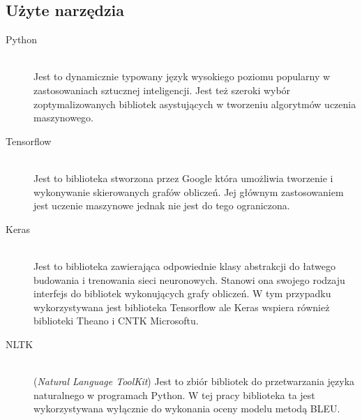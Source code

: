 \subsection{Użyte narzędzia}
\begin{description}
	\item[Python]     \hfill \\ Jest to dynamicznie typowany język wysokiego poziomu popularny w zastosowaniach sztucznej inteligencji. Jest też szeroki wybór zoptymalizowanych bibliotek asystujących w tworzeniu algorytmów uczenia maszynowego.
	\item[Tensorflow] \hfill \\ Jest to biblioteka stworzona przez Google która umożliwia tworzenie i wykonywanie skierowanych grafów obliczeń\cite{Tensorflow}. Jej głównym zastosowaniem jest uczenie maszynowe jednak nie jest do tego ograniczona.
	\item[Keras]      \hfill \\ Jest to biblioteka zawierająca odpowiednie klasy abstrakcji do łatwego budowania i trenowania sieci neuronowych.\cite{Keras} Stanowi ona swojego rodzaju interfejs do bibliotek wykonujących grafy obliczeń. W tym przypadku wykorzystywana jest biblioteka Tensorflow ale Keras wspiera również biblioteki Theano i CNTK Microsoftu.
	\item[NLTK]       \hfill \\ (\textit{Natural Language ToolKit}) Jest to zbiór bibliotek do przetwarzania języka naturalnego w programach Python.\cite{NLTK} W tej pracy biblioteka ta jest wykorzystywana wyłącznie do wykonania oceny modelu metodą BLEU. 
\end{description}
